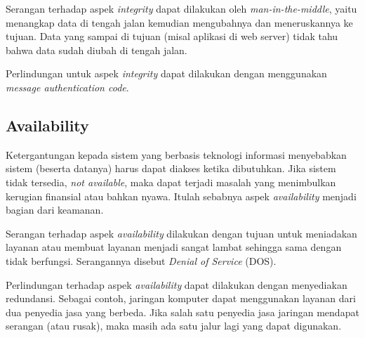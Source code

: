 Serangan terhadap aspek {\em integrity} dapat dilakukan oleh
{\em man-in-the-middle}, yaitu menangkap data di tengah jalan
kemudian mengubahnya dan meneruskannya ke tujuan.
Data yang sampai di tujuan (misal aplikasi di web server) tidak tahu
bahwa data sudah diubah di tengah jalan.

Perlindungan untuk aspek {\em integrity} dapat dilakukan dengan
menggunakan {\em message authentication code}.


\subsection{Availability}
Ketergantungan kepada sistem yang berbasis teknologi informasi
menyebabkan sistem (beserta datanya) harus dapat diakses ketika dibutuhkan.
Jika sistem tidak tersedia, {\em not available}, maka dapat terjadi
masalah yang menimbulkan kerugian finansial atau bahkan nyawa.
Itulah sebabnya aspek {\em availability} menjadi bagian dari keamanan.

Serangan terhadap aspek {\em availability} dilakukan dengan tujuan
untuk meniadakan layanan atau membuat layanan menjadi sangat lambat
sehingga sama dengan tidak berfungsi.
Serangannya disebut {\em Denial of Service} (DOS).

Perlindungan terhadap aspek {\em availability} dapat dilakukan
dengan menyediakan redundansi.
Sebagai contoh, jaringan komputer dapat menggunakan layanan dari
dua penyedia jasa yang berbeda.
Jika salah satu penyedia jasa jaringan mendapat serangan (atau rusak),
maka masih ada satu jalur lagi yang dapat digunakan.
